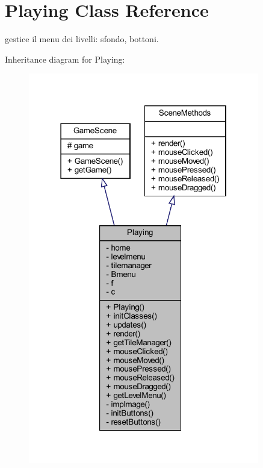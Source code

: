 \hypertarget{classscenes_1_1_playing}{}\section{Playing Class Reference}
\label{classscenes_1_1_playing}


gestice il menu dei livelli\+: sfondo, bottoni.  




Inheritance diagram for Playing\+:\nopagebreak
\begin{figure}[H]
\begin{center}
\leavevmode
\includegraphics[width=286pt]{classscenes_1_1_playing__inherit__graph}
\end{center}
\end{figure}


